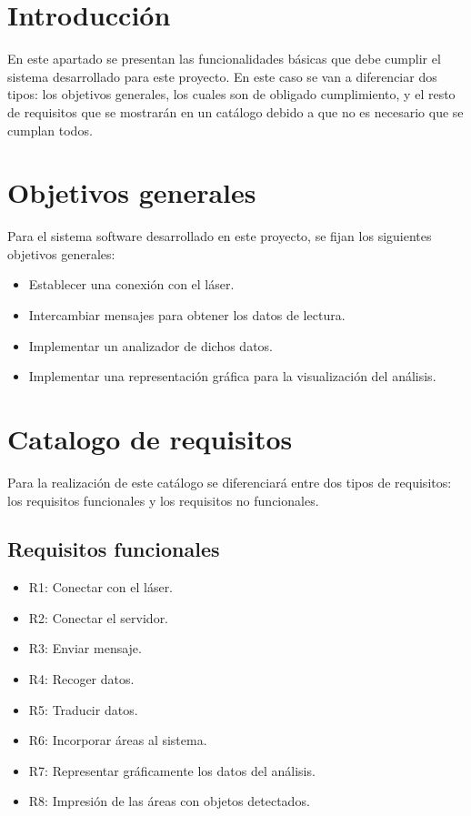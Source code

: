 
\section{Introducción}
En este apartado se presentan las funcionalidades básicas que debe cumplir el sistema desarrollado para este proyecto. En este caso se van a diferenciar dos tipos: los objetivos generales, los cuales son de obligado cumplimiento, y el resto de requisitos que se mostrarán en un catálogo debido a que  no es necesario que se cumplan todos.

\section{Objetivos generales}
Para el sistema software desarrollado en este proyecto, se fijan los siguientes objetivos generales:
\begin{itemize}
	\item Establecer una conexión con el láser.
	\item Intercambiar mensajes para obtener los datos de lectura.
	\item Implementar un analizador de dichos datos.
	\item Implementar una representación gráfica para la visualización del análisis.
\end{itemize}

\section{Catalogo de requisitos}
Para la realización de este catálogo se diferenciará entre dos tipos de requisitos: los requisitos funcionales y los requisitos no funcionales.
\subsection{Requisitos funcionales}
 \begin{itemize}
 	\item R1: Conectar con el láser.
 	\item R2: Conectar el servidor.
 	\item R3: Enviar mensaje.
 	\item R4: Recoger datos.
 	\item R5: Traducir datos.
 	\item R6: Incorporar áreas al sistema.
 	\item R7: Representar gráficamente los datos del análisis.
 	\item R8: Impresión de las áreas con objetos detectados.
 \end{itemize}

